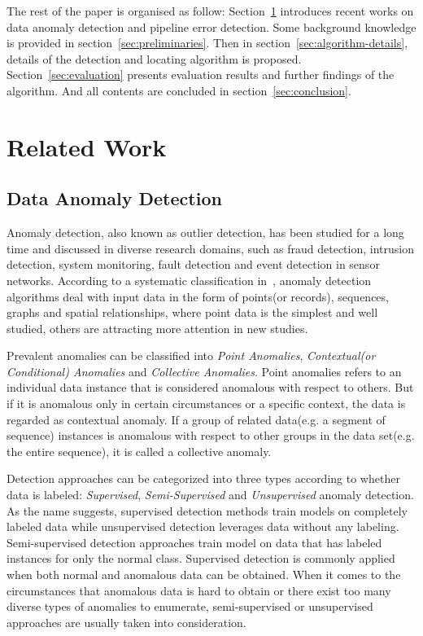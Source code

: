 \documentclass[a4paper]{IEEEtran}
\begin{document}
		The rest of the paper is organised as follow: Section~\ref{sec:related-work} introduces recent works on data anomaly detection and pipeline error detection. Some background knowledge is provided in section~\ref{sec:preliminaries}. Then in section~\ref{sec:algorithm-details}, details of the detection and locating algorithm is proposed. Section~\ref{sec:evaluation} presents evaluation results and further findings of the algorithm. And all contents are concluded in section~\ref{sec:conclusion}.
	
	\section{Related Work}\label{sec:related-work}
		\subsection{Data Anomaly Detection}
			Anomaly detection, also known as outlier detection, has been studied for a long time and discussed in diverse research domains, such as fraud detection, intrusion detection, system monitoring, fault detection and event detection in sensor networks. According to a systematic classification in~\cite{chandola2009anomaly}, anomaly detection algorithms deal with input data in the form of points(or records), sequences, graphs and spatial relationships, where point data is the simplest and well studied, others are attracting more attention in new studies.
			
			Prevalent anomalies can be classified into \textit{Point Anomalies}, \textit{Contextual(or Conditional) Anomalies} and \textit{Collective Anomalies}. Point anomalies refers to an individual data instance that is considered anomalous with respect to others. But if it is anomalous only in certain circumstances or a specific context, the data is regarded as contextual anomaly. If a group of related data(e.g. a segment of sequence) instances is anomalous with respect to other groups in the data set(e.g. the entire sequence), it is called a collective anomaly.
			
			Detection approaches can be categorized into three types according to whether data is labeled: \textit{Supervised}, \textit{Semi-Supervised} and \textit{Unsupervised} anomaly detection. As the name suggests, supervised detection methods train models on completely labeled data while unsupervised detection leverages data without any labeling. Semi-supervised detection approaches train model on data that has labeled instances for only the normal class. Supervised detection is commonly applied when both normal and anomalous data can be obtained. When it comes to the circumstances that anomalous data is hard to obtain or there exist too many diverse types of anomalies to enumerate, semi-supervised or unsupervised approaches are usually taken into consideration.
			
\end{document}
